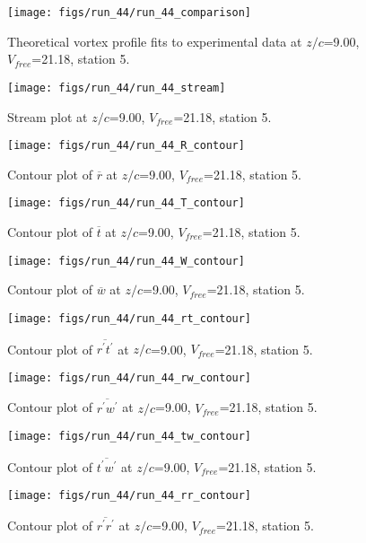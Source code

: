 \begin{figure}[H]
\centering
\texttt{[image: figs/run\_44/run\_44\_comparison]}
\caption{Theoretical vortex profile fits to experimental data at $z/c$=9.00, $V_{free}$=21.18, station 5.}
\end{figure}


\begin{figure}[H]
\centering
\texttt{[image: figs/run\_44/run\_44\_stream]}
\caption{Stream plot at $z/c$=9.00, $V_{free}$=21.18, station 5.}
\end{figure}


\begin{figure}[H]
\centering
\texttt{[image: figs/run\_44/run\_44\_R\_contour]}
\caption{Contour plot of $\overline{r}$ at $z/c$=9.00, $V_{free}$=21.18, station 5.}
\end{figure}


\begin{figure}[H]
\centering
\texttt{[image: figs/run\_44/run\_44\_T\_contour]}
\caption{Contour plot of $\overline{t}$ at $z/c$=9.00, $V_{free}$=21.18, station 5.}
\end{figure}


\begin{figure}[H]
\centering
\texttt{[image: figs/run\_44/run\_44\_W\_contour]}
\caption{Contour plot of $\overline{w}$ at $z/c$=9.00, $V_{free}$=21.18, station 5.}
\end{figure}


\begin{figure}[H]
\centering
\texttt{[image: figs/run\_44/run\_44\_rt\_contour]}
\caption{Contour plot of $\overline{r^\prime t^\prime}$ at $z/c$=9.00, $V_{free}$=21.18, station 5.}
\end{figure}


\begin{figure}[H]
\centering
\texttt{[image: figs/run\_44/run\_44\_rw\_contour]}
\caption{Contour plot of $\overline{r^\prime w^\prime}$ at $z/c$=9.00, $V_{free}$=21.18, station 5.}
\end{figure}


\begin{figure}[H]
\centering
\texttt{[image: figs/run\_44/run\_44\_tw\_contour]}
\caption{Contour plot of $\overline{t^\prime w^\prime}$ at $z/c$=9.00, $V_{free}$=21.18, station 5.}
\end{figure}


\begin{figure}[H]
\centering
\texttt{[image: figs/run\_44/run\_44\_rr\_contour]}
\caption{Contour plot of $\overline{r^\prime r^\prime}$ at $z/c$=9.00, $V_{free}$=21.18, station 5.}
\end{figure}


